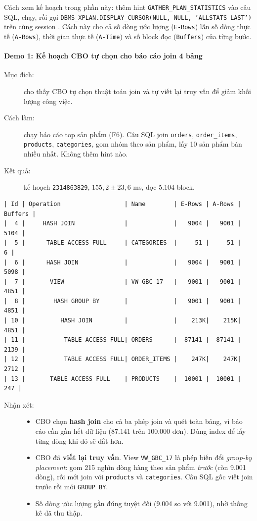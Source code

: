 Cách xem kế hoạch trong phần này: thêm hint \texttt{GATHER\_PLAN\_STATISTICS} vào câu SQL, chạy, rồi gọi \texttt{DBMS\_XPLAN.DISPLAY\_CURSOR(NULL, NULL, 'ALLSTATS LAST')} trên cùng session \cite{q-oracle-xplan}. Cách này cho cả số dòng ước lượng (\texttt{E-Rows}) lẫn số dòng thực tế (\texttt{A-Rows}), thời gian thực tế (\texttt{A-Time}) và số block đọc (\texttt{Buffers}) của từng bước.

\paragraph{Demo 1: Kế hoạch CBO tự chọn cho báo cáo join 4 bảng}\label{sec:q-demo1}
\begin{description}
  \item[Mục đích:] cho thấy CBO tự chọn thuật toán join và tự viết lại truy vấn để giảm khối lượng công việc.
  \item[Cách làm:] chạy báo cáo top sản phẩm (F6). Câu SQL join \texttt{orders}, \texttt{order\_items}, \texttt{products}, \texttt{categories}, gom nhóm theo sản phẩm, lấy 10 sản phẩm bán nhiều nhất. Không thêm hint nào.
  \item[Kết quả:] kế hoạch \texttt{2314863829}, $155{,}2 \pm 23{,}6$ ms, đọc 5.104 block.
\end{description}
\begin{Verbatim}[fontsize=\scriptsize,frame=single]
| Id | Operation                  | Name        | E-Rows | A-Rows | Buffers |
|  4 |     HASH JOIN              |             |   9004 |   9001 |    5104 |
|  5 |      TABLE ACCESS FULL     | CATEGORIES  |     51 |     51 |       6 |
|  6 |      HASH JOIN             |             |   9004 |   9001 |    5098 |
|  7 |       VIEW                 | VW_GBC_17   |   9001 |   9001 |    4851 |
|  8 |        HASH GROUP BY       |             |   9001 |   9001 |    4851 |
| 10 |          HASH JOIN         |             |    213K|    215K|    4851 |
| 11 |           TABLE ACCESS FULL| ORDERS      |  87141 |  87141 |    2139 |
| 12 |           TABLE ACCESS FULL| ORDER_ITEMS |    247K|    247K|    2712 |
| 13 |       TABLE ACCESS FULL    | PRODUCTS    |  10001 |  10001 |     247 |
\end{Verbatim}
\begin{description}
  \item[Nhận xét:]\leavevmode
  \begin{itemize}
    \item CBO chọn \textbf{hash join} cho cả ba phép join và quét toàn bảng, vì báo cáo cần gần hết dữ liệu (87.141 trên 100.000 đơn). Dùng index để lấy từng dòng khi đó sẽ đắt hơn.
    \item CBO đã \textbf{viết lại truy vấn}. View \texttt{VW\_GBC\_17} là phép biến đổi \textit{group-by placement}: gom 215 nghìn dòng hàng theo sản phẩm \emph{trước} (còn 9.001 dòng), rồi mới join với \texttt{products} và \texttt{categories}. Câu SQL gốc viết join trước rồi mới \texttt{GROUP BY}.
    \item Số dòng ước lượng gần đúng tuyệt đối (9.004 so với 9.001), nhờ thống kê đã thu thập.
  \end{itemize}
\end{description}

